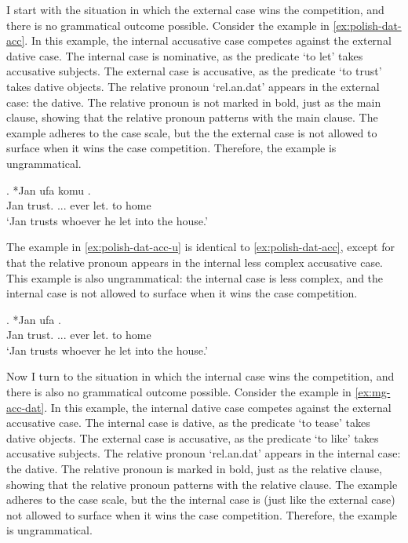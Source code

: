 I start with the situation in which the external case wins the competition, and there is no grammatical outcome possible.
Consider the example in \ref{ex:polish-dat-acc}. In this example, the internal accusative case competes against the external dative case.
The internal case is nominative, as the predicate  `to let' takes accusative subjects.
The external case is accusative, as the predicate  `to trust' takes dative objects.
The relative pronoun  `\ac{rel}.\ac{an}.\ac{dat}' appears in the external case: the dative. The relative pronoun is not marked in bold, just as the main clause, showing that the relative pronoun patterns with the main clause.
The example adheres to the case scale, but the the external case is not allowed to surface when it wins the case competition. Therefore, the example is ungrammatical.

\exg. *Jan ufa komu    .\\
Jan trust. ... ever let. to home\\
`Jan trusts whoever he let into the house.' \label{ex:polish-dat-acc}

The example in \ref{ex:polish-dat-acc-u} is identical to \ref{ex:polish-dat-acc}, except for that the relative pronoun appears in the internal less complex accusative case. This example is also ungrammatical: the internal case is less complex, and the internal case is not allowed to surface when it wins the case competition.

\exg. *Jan ufa     .\\
Jan trust. ... ever let. to home\\
`Jan trusts whoever he let into the house.' \label{ex:polish-dat-acc-u}

Now I turn to the situation in which the internal case wins the competition, and there is also no grammatical outcome possible.
Consider the example in \ref{ex:mg-acc-dat}. In this example, the internal dative case competes against the external accusative case.
The internal case is dative, as the predicate  `to tease' takes dative objects.
The external case is accusative, as the predicate  `to like' takes accusative subjects.
The relative pronoun  `\ac{rel}.\ac{an}.\ac{dat}' appears in the internal case: the dative. The relative pronoun is marked in bold, just as the relative clause, showing that the relative pronoun patterns with the relative clause.
The example adheres to the case scale, but the the internal case is (just like the external case) not allowed to surface when it wins the case competition. Therefore, the example is ungrammatical.

